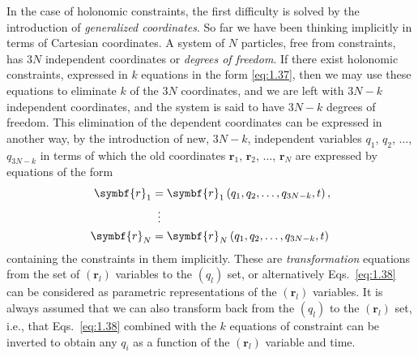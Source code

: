In the case of holonomic constraints, the first difficulty is solved by the introduction of \emph{generalized coordinates}. So far we have been thinking implicitly in terms of Cartesian coordinates. A system of \(N\) particles, free from constraints, has \(3N\) independent coordinates or \emph{degrees of freedom}. If there exist holonomic constraints, expressed in \(k\) equations in the form \eqref{eq:1.37}, then we may use these equations to eliminate \(k\) of the \(3N\) coordinates, and we are left with \(3N-k\) independent coordinates, and the system is said to have \(3N-k\) degrees of freedom. This elimination of the dependent coordinates can be expressed in another way, by the introduction of new, \(3N-k\), independent variables \(q_1\), \(q_2\), \(\ldots\), \(q_{3N-k}\) in terms of which the old coordinates \(\symbf{r}_1\), \(\symbf{r}_2\), \(\ldots\), \(\symbf{r}_N\) are expressed by equations of the form
\begin{equation}
    \begin{aligned}
        \symbf{r}_1&=\symbf{r}_1\left(q_1,q_2,\ldots,q_{3N-k},t\right),\\
        &\vdotswithin{=}\\
        \symbf{r}_N&=\symbf{r}_N\left(q_1,q_2,\ldots,q_{3N-k},t\right)
    \end{aligned}
    \label{eq:1.38}
\end{equation}
containing the constraints in them implicitly. These are \emph{transformation} equations from the set of \(\left(\symbf{r}_l\right)\) variables to the \(\left(q_l\right)\) set, or alternatively Eqs.~\eqref{eq:1.38} can be considered as parametric representations of the \(\left(\symbf{r}_l\right)\) variables. It is always assumed that we can also transform back from the \(\left(q_l\right)\) to the \(\left(\symbf{r}_l\right)\) set, i.e., that Eqs.~\eqref{eq:1.38} combined with the \(k\) equations of constraint can be inverted to obtain any \(q_i\) as a function of the \(\left(\symbf{r}_l\right)\) variable and time.

